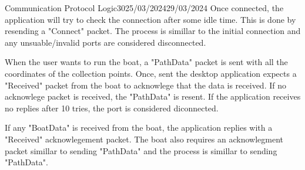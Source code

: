 \documentclass[12pt]{article}
\begin{document}
\begin{logbook-entry}{Communication Protocol Logic}{30}{25/03/2024}{29/03/2024}
Once connected, the application will try to check the connection after some idle time.
This is done by resending a "Connect" packet.
The process is simillar to the initial connection and any unsuable/invalid ports are considered disconnected.

When the user wants to run the boat, a "PathData" packet is sent with all the coordinates of the collection points.
Once, sent the desktop application expects a "Received" packet from the boat to acknowlege that the data is received.
If no acknowlege packet is received, the "PathData" is resent.
If the application receives no replies after 10 tries, the port is considered diconnected.

If any "BoatData" is received from the boat, the application replies with a "Received" acknowlegement packet.
The boat also requires an acknowlegment packet simillar to sending "PathData" and the process is simillar to sending "PathData".
\end{logbook-entry}
\end{document}
